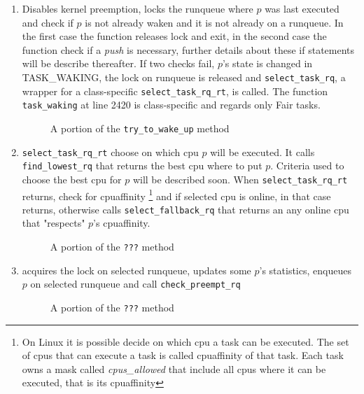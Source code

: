 \begin{enumerate}
\item Disables kernel preemption, locks the runqueue where $p$ was last executed and check 
if $p$ is not already waken and it is not already on a runqueue. In the first case the 
function releases lock and exit, in the second case the function check if a
\textit{push} is necessary, further details about these if statements will be
describe thereafter. If two checks fail, $p$'s state is changed in TASK\_WAKING, the
lock on runqueue is released and \texttt{select\_task\_rq}, a wrapper for a 
class-specific \texttt{select\_task\_rq\_rt}, is called. The function 
\texttt{task\_waking} at line 2420 is class-specific and regards only Fair tasks.

\begin{figure}[h]
  \lstset{basicstyle=\footnotesize, language=c, captionpos=b, frame=single,label=lis:steps}
  
  \label{code:ttwu}
  \caption{A portion of the \texttt{try\_to\_wake\_up} method}
\end{figure}

\item \texttt{select\_task\_rq\_rt} choose on which cpu $p$ will be executed. It
calls \texttt{find\_lowest\_rq} that returns the best cpu where to put $p$. Criteria
used to choose the best cpu for $p$ will be described soon. When \texttt{select\_task\_rq\_rt} 
returns, check for cpuaffinity \footnote{On Linux it is possible decide on which
cpu a task can be executed. The set of cpus that can execute a task is called 
cpuaffinity of that task. Each task owns a mask called \textit{cpus\_allowed} 
that include all cpus where it can be executed, that is its cpuaffinity} and 
if selected cpu is online, in that case returns, otherwise calls 
\texttt{select\_fallback\_rq} that returns an any online cpu that "respects" 
$p$'s cpuaffinity.

\begin{figure}[h]
  \lstset{basicstyle=\footnotesize, language=c, captionpos=b, frame=single,label=lis:steps}
  
  \label{code:ttwu}
  \caption{A portion of the \texttt{???} method}
\end{figure}

\item acquires the lock on selected runqueue, updates some $p$'s statistics, enqueues 
$p$ on selected runqueue and call \texttt{check\_preempt\_rq} 

\begin{figure}[h]
  \lstset{basicstyle=\footnotesize, language=c, captionpos=b, frame=single,label=lis:steps}
  
  \label{code:ttwu}
  \caption{A portion of the \texttt{???} method}
\end{figure}


\end{enumerate}
